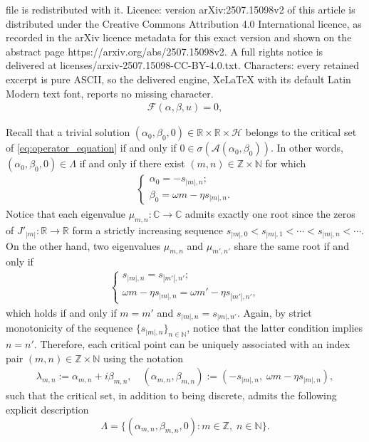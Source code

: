 \documentclass[10pt,a4paper]{amsart}
\def\bc{{\mathbb{C}}}
\def\bn{{\mathbb{N}}}
\def\br{{\mathbb{R}}}
\def\bz{{\mathbb{Z}}}
\begin{document}
file is redistributed with it. Licence: version arXiv:2507.15098v2 of this article is distributed under the Creative Commons Attribution 4.0 International licence, as recorded in the arXiv licence metadata for this exact version and shown on the abstract page https://arxiv.org/abs/2507.15098v2. A full rights notice is delivered at licenses/arxiv-2507.15098-CC-BY-4.0.txt. Characters: every retained excerpt is pure ASCII, so the delivered engine, XeLaTeX with its default Latin Modern text font, reports no missing character.
\begin{align}\label{eq:operator_equation}
    \mathscr F(\alpha,\beta,u) = 0,
\end{align}

\begin{remark} \label{rm:critical_values} \rm
Recall that a trivial solution $(\alpha_0,\beta_0,0) \in \br \times \br \times \mathscr H$ belongs to the critical set of \eqref{eq:operator_equation} if and only if $0 \in \sigma(\mathscr A(\alpha_0,\beta_0))$. In other words, $(\alpha_0,\beta_0,0) \in \Lambda$ if and only if 
there exist $(m,n) \in \bz \times \bn$
for which 
\begin{align*}
\begin{cases}
\alpha_0 = -s_{|m|,n}; \\
\beta_0 = \omega m  -\eta s_{|m|,n}.
\end{cases}
\end{align*}
Notice that each eigenvalue $\mu_{m,n}: \bc \rightarrow \bc$ admits exactly one root since the zeros of $J'_{|m|}: \br \rightarrow \br$ form a strictly increasing sequence $s_{|m|,0} < s_{|m|,1} < \cdots < s_{|m|,n} < \cdots$. On the other hand, two eigenvalues $\mu_{m,n}$ and $\mu_{m',n'}$ share the same root if and only if
\begin{align*}
 \begin{cases}
s_{|m|,n} = s_{|m'|,n'}; \\
\omega m  - \eta s_{|m|,n} = \omega m'  - \eta s_{|m'|,n'},
\end{cases}   
\end{align*}
which holds if and only if $m = m'$ and $s_{|m|,n} = s_{|m|,n'}$. Again, by strict monotonicity of the sequence  $\{s_{|m|,n}\}_{n \in \mathbb N }$, notice that the latter condition implies $n = n'$. Therefore, each critical point can be uniquely associated with an index pair $(m,n) \in \bz \times \bn$ using the notation 
\begin{align}\label{def:critical_point_identification}
\lambda_{m,n} := \alpha_{m,n} + i \beta_{m,n}, \quad  (\alpha_{m,n}, \beta_{m,n}) :=  \left(-s_{|m|,n}, \; \omega m  - \eta s_{|m|,n} \right),
\end{align}
such that the critical set, in addition to being discrete, admits the following explicit description
\[
\Lambda = \{ (\alpha_{m,n},\beta_{m,n},0) : m \in \bz, \;  n \in  \bn  \}.
\]
\end{remark}
\end{document}
